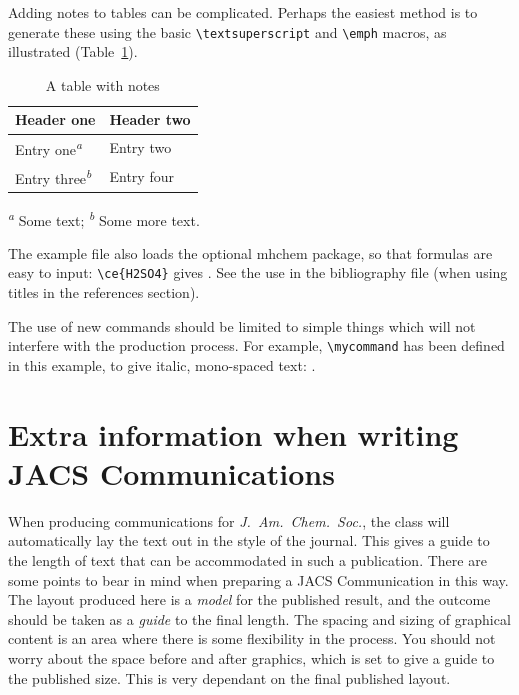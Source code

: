 Adding notes to tables can be complicated.  Perhaps the easiest
method is to generate these using the basic
\texttt{\textbackslash textsuperscript} and
\texttt{\textbackslash emph} macros, as illustrated (Table~\ref{tbl:notes}).
\begin{table}
  \caption{A table with notes}
  \label{tbl:notes}
  \begin{tabular}{ll}
    \hline
    Header one                            & Header two \\
    \hline
    Entry one\textsuperscript{\emph{a}}   & Entry two  \\
    Entry three\textsuperscript{\emph{b}} & Entry four \\
    \hline
  \end{tabular}

  \textsuperscript{\emph{a}} Some text;
  \textsuperscript{\emph{b}} Some more text.
\end{table}

The example file also loads the optional \textsf{mhchem} package, so
that formulas are easy to input: \texttt{\textbackslash ce\{H2SO4\}}
gives .  See the use in the bibliography file (when using
titles in the references section).

The use of new commands should be limited to simple things which will
not interfere with the production process.  For example,
\texttt{\textbackslash mycommand} has been defined in this example,
to give italic, mono-spaced text: .

\section{Extra information when writing JACS Communications}

When producing communications for \emph{J.~Am.\ Chem.\ Soc.}, the
class will automatically lay the text out in the style of the
journal. This gives a guide to the length of text that can be
accommodated in such a publication. There are some points to bear in
mind when preparing a JACS Communication in this way.  The layout
produced here is a \emph{model} for the published result, and the
outcome should be taken as a \emph{guide} to the final length. The
spacing and sizing of graphical content is an area where there is
some flexibility in the process.  You should not worry about the
space before and after graphics, which is set to give a guide to the
published size. This is very dependant on the final published layout.

